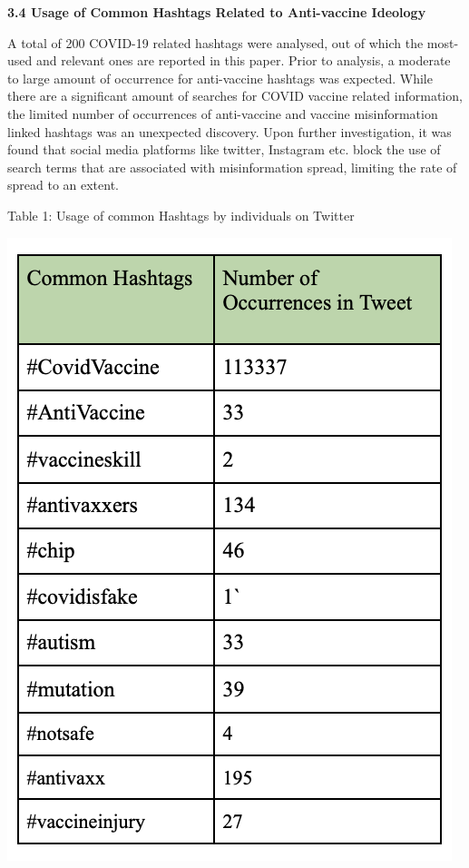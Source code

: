 \documentclass[10pt,twocolumn,letterpaper]{article}
\begin{document}
\vspace{\baselineskip}
\textbf{3.4 Usage of Common Hashtags Related to Anti-vaccine Ideology}

\vspace{\baselineskip}

A total of 200 COVID-19 related hashtags were analysed, out of which the most-used  and relevant ones are reported in this paper. Prior to analysis, a moderate to large amount of occurrence for anti-vaccine hashtags was expected. While there are a significant amount of searches for COVID vaccine related information, the limited number of occurrences of anti-vaccine and vaccine misinformation linked hashtags was an unexpected discovery. Upon further investigation, it was found that social media platforms like twitter, Instagram etc. block the use of search terms that are associated with misinformation spread, limiting the rate of spread to an extent. 

\caption{Table 1: Usage of common Hashtags by individuals on Twitter}
\includegraphics[scale=0.8]{Table 1.png}
\end{document}
